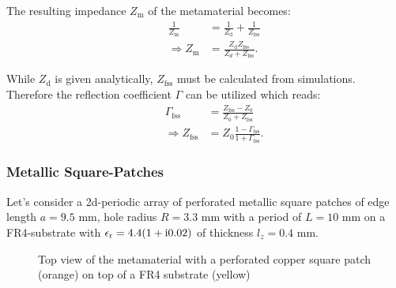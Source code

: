The resulting impedance $Z_\mathrm{m}$ of the metamaterial becomes:
\begin{align}
\nonumber
&&\frac{1}{Z_\mathrm{m}} &= \frac{1}{Z_\mathrm{d}} + \frac{1}{Z_\mathrm{fss}}\\
&&\Rightarrow Z_\mathrm{m} &= \frac{Z_\mathrm{d} Z_\mathrm{fss}}{Z_d + Z_\mathrm{fss}}.
\end{align}

While $Z_\mathrm{d}$ is given analytically, $Z_\mathrm{fss}$ must be calculated from simulations. Therefore the reflection coefficient
$\Gamma$ can be utilized which reads:
\begin{align}
\nonumber
&&\Gamma_\mathrm{fss} &= \frac{Z_\mathrm{fss}-Z_0}{Z_0 + Z_\mathrm{fss}}\\
&&\Rightarrow Z_\mathrm{fss} &= Z_0 \frac{1 - \Gamma_\mathrm{fss}}{1 + \Gamma_\mathrm{fss}}.
\end{align}

\subsubsection{Metallic Square-Patches}
Let's consider a 2d-periodic array of perforated metallic square patches of edge length $a=9.5$ mm, hole radius $R=3.3$ mm with a period of $L=10$ mm on a FR4-substrate with $\epsilon_\mathrm{r}=4.4(1+\mathrm{i} 0.02)$ of thickness $l_z=0.4$ mm.

\begin{figure}
\centering
{}
\caption{Top view of the metamaterial with a perforated copper square patch (orange) on top of a FR4 substrate (yellow)}
\label{fig:SquarePatch}
\end{figure}